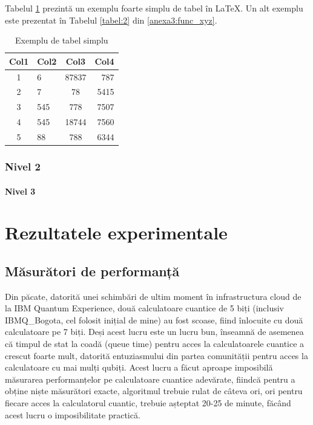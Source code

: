 Tabelul \ref{tabel:tab_simplu} prezintă un exemplu foarte simplu de tabel în \LaTeX. Un alt exemplu este prezentat în Tabelul \ref{tabel:2} din \ref{anexa3:func_xyz}.

\begin{table}[ht]
    \centering
    \caption{Exemplu de tabel simplu}
    \label{tabel:tab_simplu}
    \begin{tabular}{||c l c r||} 
        \hline
        \textbf{Col1} & \textbf{Col2} & \textbf{Col3} & \textbf{Col4} \\
        \hline\hline
        1 & 6 & 87837 & 787 \\ 
        2 & 7 & 78 & 5415 \\
        3 & 545 & 778 & 7507 \\
        4 & 545 & 18744 & 7560 \\
        5 & 88 & 788 & 6344 \\
        \hline
    \end{tabular}
\end{table}

\subsection{Nivel 2}
\label{cap:cap4:nivel1:nivel2}

\subsubsection{Nivel 3}
\label{cap:cap4:nivel1:nivel2:nivel3}

\textcolor{gray}{\lipsum}

\textcolor{gray}{\lipsum}

\textcolor{gray}{\lipsum}

\fi

\chapter{Rezultatele experimentale}
\label{cap:cap4}

\section{Măsurători de performanță}

Din păcate, datorită unei schimbări de ultim moment în infrastructura cloud de la IBM Quantum Experience, două calculatoare cuantice de 5 biți (inclusiv IBMQ\_Bogota, cel folosit inițial de mine) au fost scoase, fiind înlocuite cu două calculatoare pe 7 biți. Deși acest lucru este un lucru bun, înseamnă de asemenea că timpul de stat la coadă (queue time) pentru acces la calculatoarele cuantice a crescut foarte mult, datorită entuziasmului din partea comunității pentru acces la calculatoare cu mai mulți qubiți. Acest lucru a făcut aproape imposibilă măsurarea performanțelor pe calculatoare cuantice adevărate, fiindcă pentru a obține niște măsurători exacte, algoritmul trebuie rulat de câteva ori, ori pentru fiecare acces la calculatorul cuantic, trebuie așteptat 20-25 de minute, făcând acest lucru o imposibilitate practică. 

